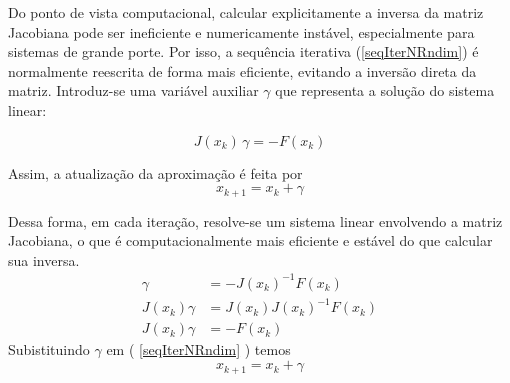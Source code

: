 Do ponto de vista computacional, calcular explicitamente a inversa da matriz Jacobiana pode ser ineficiente e numericamente instável, especialmente para sistemas de grande porte. Por isso, a sequência iterativa (\ref{seqIterNRndim}) é normalmente reescrita de forma mais eficiente, evitando a inversão direta da matriz. Introduz-se uma variável auxiliar $\gamma$ que representa a solução do sistema linear:

\begin{equation*}
    J(x_k)\,\gamma = -F(x_k)
\end{equation*}

Assim, a atualização da aproximação é feita por
\begin{equation*}
    x_{k+1} = x_k + \gamma
\end{equation*}

Dessa forma, em cada iteração, resolve-se um sistema linear envolvendo a matriz Jacobiana, o que é computacionalmente mais eficiente e estável do que calcular sua inversa.
\begin{align*}
    \gamma &= - J(x_k)^{-1} F(x_k) \\
    J(x_k) \gamma &= J(x_k) J(x_k)^{-1} F(x_k) \\
    J(x_k) \gamma &= - F(x_k) \label{auxNRndim}
\end{align*}
Subistituindo $\gamma$ em ( \ref{seqIterNRndim} ) temos
\begin{equation*}
    x_{k+1} = x_k + \gamma
\end{equation*}

\newpage

